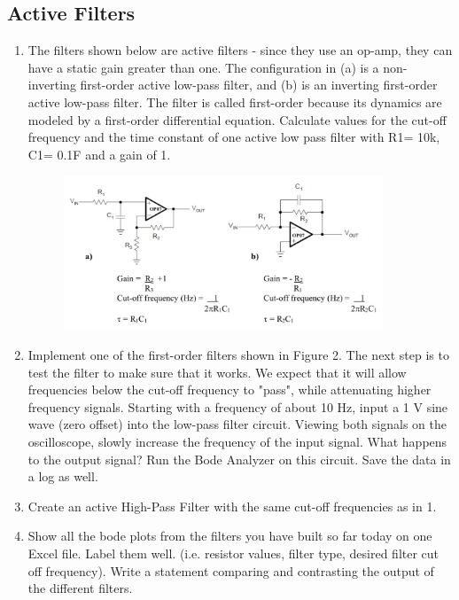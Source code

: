 \documentclass{article}
\begin{document}
\subsection*{Active Filters}
\begin{enumerate}
	\item The filters shown below are active filters - since they use an op-amp, they can have a static gain greater than one. The configuration in (a) is a non-inverting first-order active low-pass filter, and (b) is an inverting first-order active low-pass filter. The filter is called first-order because its dynamics are modeled by a first-order differential equation. Calculate values for the cut-off frequency and the time constant of one active low pass filter with R1= 10k\textOmega, C1= 0.1\textmu F and a gain of 1.
	\begin{figure}[h]
    	\includegraphics[width=0.9\textwidth]{lab_1_fig_4.jpg}
    	\centering
		\end{figure}
	\item Implement one of the first-order filters shown in Figure 2. The next step is to test the filter to make sure that it works. We expect that it will allow frequencies below the cut-off frequency to "pass", while attenuating higher frequency signals. Starting with a frequency of about 10 Hz, input a 1 V sine wave (zero offset) into the low-pass filter circuit. Viewing both signals on the oscilloscope, slowly increase the frequency of the input signal. What happens to the output signal? Run the Bode Analyzer on this circuit. Save the data in a log as well.
	\item Create an active High-Pass Filter with the same cut-off frequencies as in 1.
	\item Show all the bode plots from the filters you have built so far today on one Excel file. Label them well. (i.e. resistor values, filter type, desired filter cut off frequency). Write a statement comparing and contrasting the output of the different filters.
\end{enumerate}
\end{document}
